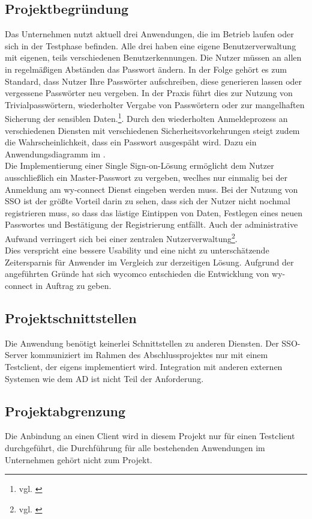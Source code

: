 \subsection{Projektbegründung} 
\label{sec:Projektbegruendung}
Das Unternehmen nutzt aktuell drei Anwendungen, die im Betrieb laufen oder sich in der Testphase befinden. Alle drei haben eine eigene Benutzerverwaltung mit eigenen, teils verschiedenen Benutzerkennungen. Die Nutzer müssen an allen in regelmäßigen Abständen das Passwort ändern. 
In der Folge gehört es zum Standard, dass Nutzer Ihre Passwörter aufschreiben, diese generieren lassen oder vergessene Passwörter neu vergeben. In der Praxis führt dies zur Nutzung von Trivialpasswörtern, wiederholter Vergabe von Passwörtern oder zur mangelhaften Sicherung der sensiblen Daten.\footnote{vgl. \cite{datenschutzbeauftragter}}. 
Durch den wiederholten Anmeldeprozess an verschiedenen Diensten mit verschiedenen Sicherheitsvorkehrungen steigt zudem die Wahrscheinlichkeit, dass ein Passwort ausgespäht wird. 
Dazu ein Anwendungsdiagramm im . \\
Die Implementierung einer Single Sign-on-Lösung ermöglicht dem Nutzer ausschließlich ein Master-Passwort zu vergeben, weclhes nur einmalig bei der Anmeldung am wy-connect Dienst eingeben werden muss. Bei der Nutzung von \ac{SSO} ist der größte Vorteil darin zu sehen, dass sich der Nutzer nicht nochmal registrieren muss, so dass das lästige Eintippen von Daten, Festlegen eines neuen Passwortes und Bestätigung der Registrierung entfällt. Auch der administrative Aufwand verringert sich bei einer zentralen Nutzerverwaltung\footnote{vgl. \cite{univention}}.\\
Dies verspricht eine bessere Usability und eine nicht zu unterschätzende Zeitersparnis für Anwender im Vergleich zur derzeitigen Lösung. 
Aufgrund der angeführten Gründe hat sich wycomco entschieden die Entwicklung von wy-connect in Auftrag zu geben.
\subsection{Projektschnittstellen} 
\label{sec:Projektschnittstellen}
Die Anwendung benötigt keinerlei Schnittstellen zu anderen Diensten. Der \ac{SSO}-Server kommuniziert im Rahmen des Abschlussprojektes nur mit einem Testclient, der eigens implementiert wird.
Integration mit anderen externen Systemen wie dem \ac{AD} ist nicht Teil der Anforderung.
\subsection{Projektabgrenzung} 
\label{sec:Projektabgrenzung}
Die Anbindung an einen Client wird in diesem Projekt nur für einen Testclient durchgeführt, die Durchführung für alle bestehenden Anwendungen im Unternehmen gehört nicht zum Projekt.